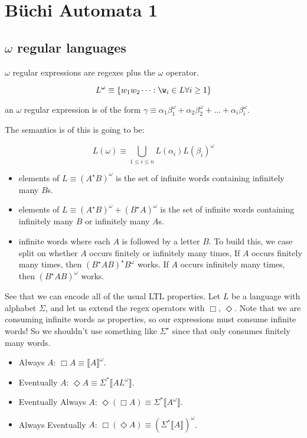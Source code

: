 \chapter{B\"uchi Automata 1}

\section{$\omega$ regular languages}
$\omega$ regular expressions are regexes plus the $\omega$ operator.

$$L^\omega \equiv \{ w_1 w_2 \dots : \w_i \in L \forall i \geq 1 \}$$

an $\omega$ regular expression is of the form $\gamma \equiv \alpha_1 \beta_1^\omega + \alpha_2 \beta_2 ^\omega + \dots + \alpha_i \beta_i ^ \omega$.

The semantics is of this is going to be:

$$
L(\omega) \equiv \bigcup_{1 \leq i \leq n} L(\alpha_i) L(\beta_i)^\omega
$$


\begin{itemize}
\item elements of $L \equiv (A^\star B)^\omega$ is the set of infinite words containing infinitely many $B$s.
\item elements of $L \equiv (A^\star B)^\omega + (B^\star A)^\omega$ is the set of infinite words containing infinitely many $B$ or infinitely many $A$s.
\item infinite words where each $A$ is followed by a letter $B$. To build this, we case split on whether $A$ occurs finitely or infinitely many times,
 If $A$ occurs finitely many times, then $(B^\star A B)^\star B^\omega$ works.
 If $A$ occurs infinitely many times, then $(B^\star A B) ^\omega$ works.
\end{itemize}

See that we can encode all of the usual LTL properties. Let $L$ be a language with alphabet $\Sigma$, and let us extend the regex operators with $\Box$, $\Diamond$.
Note that we are consuming infinite words as properties, so our expressions must consume infinite words! So we shouldn't use something like $\Sigma^\star$
since that only consumes finitely many words.

\begin{itemize}
\item Always $A$: $\Box A \equiv \llbracket A \rrbracket^\omega$.
\item Eventually $A$: $\Diamond A \equiv \Sigma^* \llbracket A L^\omega \rrbracket$.
\item Eventually Always $A$: $\Diamond (\Box A) \equiv \Sigma^* \llbracket A^\omega \rrbracket$.
\item Always Eventually $A$: $\Box (\Diamond A) \equiv (\Sigma^* \llbracket A \rrbracket)^\omega$.
\end{itemize}


